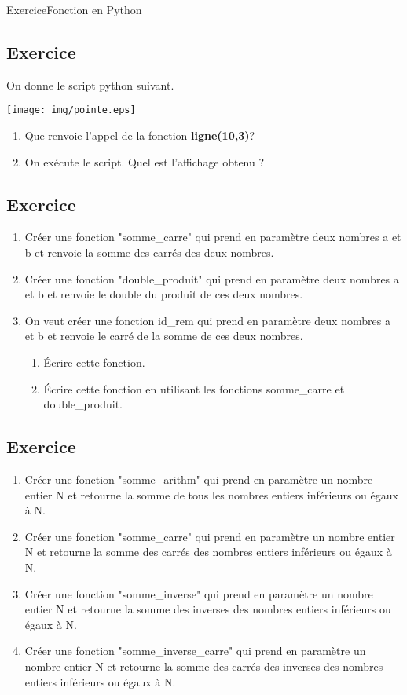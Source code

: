 \documentclass[11pt,a4paper]{article}
\newcounter{numexo}
\begin{document}
\begin{NSI}
{Exercice}{Fonction en Python}
\end{NSI}


\addtocounter{numexo}{1}
\subsection*{\Large Exercice \thenumexo }
On donne le script python suivant.
\begin{center}
\texttt{[image: img/pointe.eps]}
\end{center}
\begin{enumerate}
\item Que renvoie l'appel de la fonction \textbf{ligne(10,3)}?
\item On exécute le script. Quel est l'affichage obtenu ?
\end{enumerate}


\addtocounter{numexo}{1}
\subsection*{\Large Exercice \thenumexo }
\begin{enumerate}
\item Créer une fonction "somme\_carre" qui prend en paramètre deux nombres a et b et renvoie la somme des carrés des deux nombres.
\item Créer une fonction "double\_produit" qui prend en paramètre deux nombres a et b et renvoie le double du produit de ces deux nombres.
\item On veut créer une fonction id\_rem qui prend en paramètre deux nombres a et b et renvoie le carré de la somme de ces deux nombres.
\begin{enumerate}
\item Écrire cette fonction.
\item Écrire cette fonction en utilisant les fonctions somme\_carre et double\_produit.
\end{enumerate}
\end{enumerate}

\addtocounter{numexo}{1}
\subsection*{\Large Exercice \thenumexo }
\begin{enumerate}
\item Créer une fonction "somme\_arithm" qui prend en paramètre un nombre entier N et retourne la somme de tous les nombres entiers inférieurs ou égaux à N.
\item Créer une fonction "somme\_carre" qui prend en paramètre un nombre entier N et retourne la somme des carrés des nombres entiers inférieurs ou égaux à N.
\item Créer une fonction "somme\_inverse" qui prend en paramètre un nombre entier N et retourne la somme des inverses des nombres entiers inférieurs ou égaux à N.
\item Créer une fonction "somme\_inverse\_carre" qui prend en paramètre un nombre entier N et retourne la somme des carrés des inverses des nombres entiers inférieurs ou égaux à N.
\end{enumerate}
\end{document}

